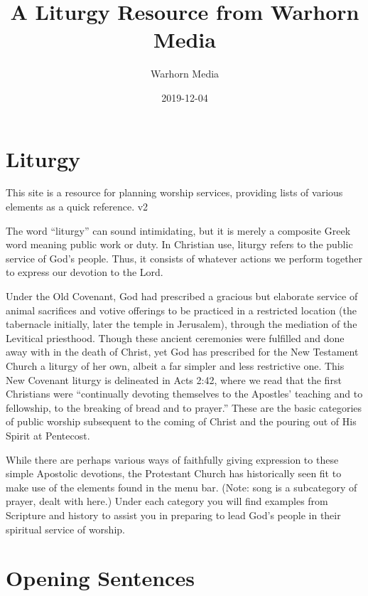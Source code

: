 \documentclass[]{book}
\title{A Liturgy Resource from Warhorn Media}
\author{Warhorn Media}
\date{2019-12-04}
\begin{document}
\maketitle

{
\setcounter{tocdepth}{1}
\tableofcontents
}
\chapter*{Liturgy}\label{liturgy}

This site is a resource for planning worship services, providing lists
of various elements as a quick reference. v2

The word ``liturgy'' can sound intimidating, but it is merely a
composite Greek word meaning public work or duty. In Christian use,
liturgy refers to the public service of God's people. Thus, it consists
of whatever actions we perform together to express our devotion to the
Lord.

Under the Old Covenant, God had prescribed a gracious but elaborate
service of animal sacrifices and votive offerings to be practiced in a
restricted location (the tabernacle initially, later the temple in
Jerusalem), through the mediation of the Levitical priesthood. Though
these ancient ceremonies were fulfilled and done away with in the death
of Christ, yet God has prescribed for the New Testament Church a liturgy
of her own, albeit a far simpler and less restrictive one. This New
Covenant liturgy is delineated in Acts 2:42, where we read that the
first Christians were ``continually devoting themselves to the Apostles'
teaching and to fellowship, to the breaking of bread and to prayer.''
These are the basic categories of public worship subsequent to the
coming of Christ and the pouring out of His Spirit at Pentecost.

While there are perhaps various ways of faithfully giving expression to
these simple Apostolic devotions, the Protestant Church has historically
seen fit to make use of the elements found in the menu bar. (Note: song
is a subcategory of prayer, dealt with here.) Under each category you
will find examples from Scripture and history to assist you in preparing
to lead God's people in their spiritual service of worship.

\chapter*{Opening Sentences}\label{opening-sentences}
\end{document}
